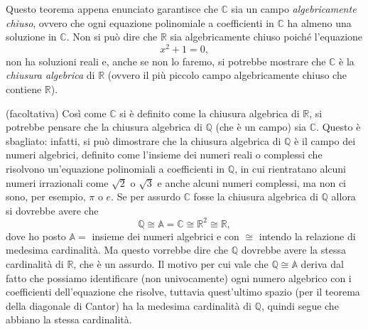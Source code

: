 Questo teorema appena enunciato garantisce che $\mathbb{C}$ sia un campo \emph{algebricamente chiuso}, ovvero che ogni equazione polinomiale a coefficienti in $\mathbb{C}$ ha almeno una soluzione in $\mathbb{C}$. Non si può dire che $\mathbb{R}$ sia algebricamente chiuso poiché l'equazione
$$
x^2 + 1 = 0,
$$
non ha soluzioni reali e, anche se non lo faremo, si potrebbe mostrare che $\mathbb{C}$ è la \emph{chiusura algebrica} di $\mathbb{R}$ (ovvero il più piccolo campo algebricamente chiuso che contiene $\mathbb{R}$).

\begin{remark}(facoltativa)
    Così come $\mathbb{C}$ si è definito come la chiusura algebrica di $\mathbb{R}$, si potrebbe pensare che la chiusura algebrica di $\mathbb{Q}$ (che è un campo) sia $\mathbb{C}$. Questo è sbagliato: infatti, si può dimostrare che la chiusura algebrica di $\mathbb{Q}$ è il campo dei numeri algebrici, definito come l'insieme dei numeri reali o complessi che risolvono un'equazione polinomiali a coefficienti in $\mathbb{Q}$, in cui rientratano alcuni numeri irrazionali come $\sqrt{2}$ o $\sqrt{3}$ e anche alcuni numeri complessi, ma non ci sono, per esempio, $\pi$ o $e$. Se per assurdo $\mathbb{C}$ fosse la chiusura algebrica di $\mathbb{Q}$ allora si dovrebbe avere che
    $$
        \mathbb{Q} \cong \mathbb{A} = \mathbb{C} \cong \mathbb{R}^2 \cong \mathbb{R},
    $$
    dove ho posto $\mathbb{A} =$ insieme dei numeri algebrici e con $\cong$ intendo la relazione di medesima cardinalità. Ma questo vorrebbe dire che $\mathbb{Q}$ dovrebbe avere la stessa cardinalità di $\mathbb{R}$, che è un assurdo. Il motivo per cui vale che $\mathbb{Q} \cong \mathbb{A}$ deriva dal fatto che possiamo identificare (non univocamente) ogni numero algebrico con i coefficienti dell'equazione che risolve, tuttavia quest'ultimo spazio (per il teorema della diagonale di Cantor) ha la medesima cardinalità di $\mathbb{Q}$, quindi segue che abbiano la stessa cardinalità.
\end{remark}

